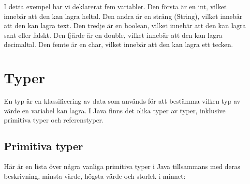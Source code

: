 \hypertarget{cb1}{}
\begin{Shaded}
\begin{Highlighting}[]
\OperatorTok{=} \OperatorTok{;}

\OperatorTok{=} \OperatorTok{;}

\OperatorTok{=} \OperatorTok{;}

\OperatorTok{=} \OperatorTok{;}

\OperatorTok{=} \OperatorTok{;}
\end{Highlighting}
\end{Shaded}

I detta exempel har vi deklarerat fem variabler. Den första är en int,
vilket innebär att den kan lagra heltal. Den andra är en sträng
(String), vilket innebär att den kan lagra text. Den tredje är en
boolean, vilket innebär att den kan lagra sant eller falskt. Den fjärde
är en double, vilket innebär att den kan lagra decimaltal. Den femte är
en char, vilket innebär att den kan lagra ett tecken.

\hypertarget{typer}{%
\section{Typer}\label{typer}}

En typ är en klassificering av data som används för att bestämma vilken
typ av värde en variabel kan lagra. I Java finns det olika typer av
typer, inklusive primitiva typer och referenstyper.

\hypertarget{primitiva-typer}{%
\subsection{Primitiva typer}\label{primitiva-typer}}

Här är en lista över några vanliga primitiva typer i Java tillsammans
med deras beskrivning, minsta värde, högsta värde och storlek i minnet:

